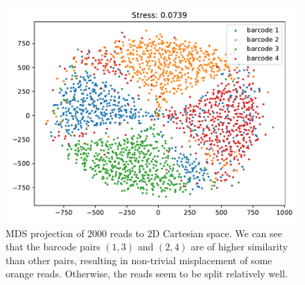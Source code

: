 \begin{figure}[!ht]
    \centering
    \includegraphics[width=15.5cm]{images/mds2000_2D.pdf}
    \caption[MDS projection to $2$D space]{MDS projection of $2000$ reads to $2$D Cartesian space. We can see that the barcode pairs $(1, 3)$ and $(2, 4)$ are of higher similarity than other pairs, resulting in non-trivial misplacement of some orange reads. Otherwise, the reads seem to be split relatively well.}
    \label{fig:2000_MDS_2D}
\end{figure}

